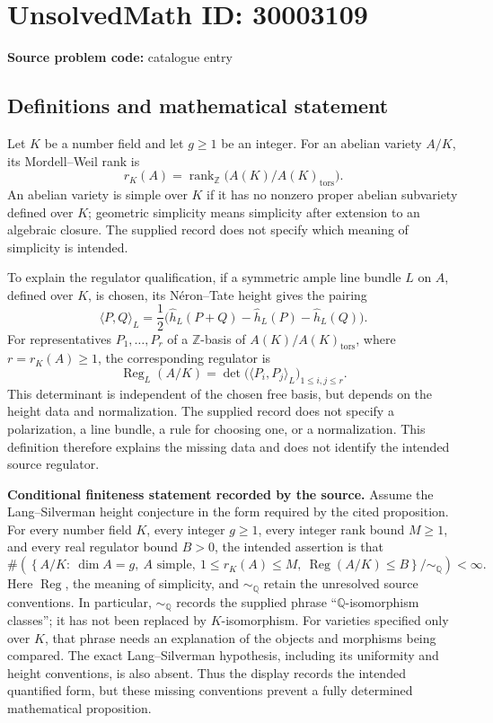 \documentclass[11pt]{article}
\newcommand{\Z}{\mathbb{Z}}
\newcommand{\Q}{\mathbb{Q}}
\begin{document}
\section*{UnsolvedMath ID: 30003109}
\textbf{Source problem code:} catalogue entry
\subsection{Definitions and mathematical statement}
Let \(K\) be a number field and let \(g\geq 1\) be an integer. For an abelian variety \(A/K\), its Mordell--Weil rank is
\[
r_K(A)=\operatorname{rank}_{\Z}\bigl(A(K)/A(K)_{\mathrm{tors}}\bigr).
\]
An abelian variety is simple over \(K\) if it has no nonzero proper abelian subvariety defined over \(K\); geometric simplicity means simplicity after extension to an algebraic closure. The supplied record does not specify which meaning of simplicity is intended.

To explain the regulator qualification, if a symmetric ample line bundle \(L\) on \(A\), defined over \(K\), is chosen, its N\'eron--Tate height gives the pairing
\[
\langle P,Q\rangle_L=\frac{1}{2}\bigl(\widehat h_L(P+Q)-\widehat h_L(P)-\widehat h_L(Q)\bigr).
\]
For representatives \(P_1,\ldots,P_r\) of a \(\Z\)-basis of \(A(K)/A(K)_{\mathrm{tors}}\), where \(r=r_K(A)\geq1\), the corresponding regulator is
\[
\operatorname{Reg}_L(A/K)=\det\bigl(\langle P_i,P_j\rangle_L\bigr)_{1\leq i,j\leq r}.
\]
This determinant is independent of the chosen free basis, but depends on the height data and normalization. The supplied record does not specify a polarization, a line bundle, a rule for choosing one, or a normalization. This definition therefore explains the missing data and does not identify the intended source regulator.

\textbf{Conditional finiteness statement recorded by the source.} Assume the Lang--Silverman height conjecture in the form required by the cited proposition. For every number field \(K\), every integer \(g\geq1\), every integer rank bound \(M\geq1\), and every real regulator bound \(B>0\), the intended assertion is that
\[
\#\left(
\left\{A/K:\ \dim A=g,\ A\text{ simple},\ 1\leq r_K(A)\leq M,\ \operatorname{Reg}(A/K)\leq B\right\}\big/\!\sim_{\Q}
\right)<\infty.
\]
Here \(\operatorname{Reg}\), the meaning of simplicity, and \(\sim_{\Q}\) retain the unresolved source conventions. In particular, \(\sim_{\Q}\) records the supplied phrase ``\(\Q\)-isomorphism classes''; it has not been replaced by \(K\)-isomorphism. For varieties specified only over \(K\), that phrase needs an explanation of the objects and morphisms being compared. The exact Lang--Silverman hypothesis, including its uniformity and height conventions, is also absent. Thus the display records the intended quantified form, but these missing conventions prevent a fully determined mathematical proposition.
\end{document}
